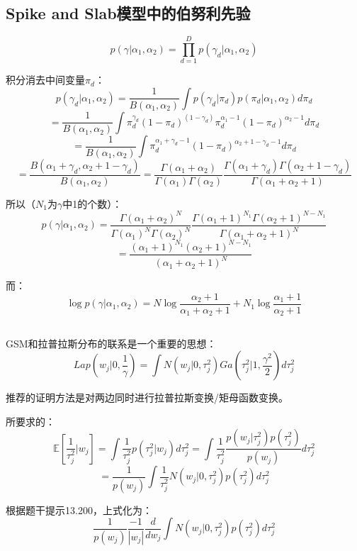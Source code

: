 \documentclass[UTF8]{ctexart}
\begin{document}
\subsection{Spike and Slab模型中的伯努利先验}
$$p(\gamma|\alpha_{1},\alpha_{2})=\prod_{d=1}^{D}p(\gamma_{d}|\alpha_{1},\alpha_{2})$$

积分消去中间变量$\pi_{d}$：
$$p(\gamma_{d}|\alpha_{1},\alpha_{2})=\frac{1}{B(\alpha_{1},\alpha_{2})}\int p(\gamma_{d}|\pi_{d})p(\pi_{d}|\alpha_{1},\alpha_{2})d\pi_{d}$$
$$=\frac{1}{B(\alpha_{1},\alpha_{2})}\int \pi_{d}^{\gamma_{d}}(1-\pi_{d})^{(1-\gamma_{d})}\pi_{d}^{\alpha_{1}-1}(1-\pi_{d})^{\alpha_{2}-1}d\pi_{d}$$
$$=\frac{1}{B(\alpha_{1},\alpha_{2})}\int \pi_{d}^{\alpha_{1}+\gamma_{d}-1}(1-\pi_{d})^{\alpha_{2}+1-\gamma_{d} - 1}d\pi_{d}$$
$$=\frac{B(\alpha_{1}+\gamma_{d},\alpha_{2}+1-\gamma_{d})}{B(\alpha_{1},\alpha_{2})}=\frac{\Gamma(\alpha_{1}+\alpha_{2})}{\Gamma(\alpha_{1})\Gamma(\alpha_{2})} \frac{\Gamma(\alpha_{1}+\gamma_{d})\Gamma(\alpha_{2}+1-\gamma_{d})}{\Gamma(\alpha_{1}+\alpha_{2}+1)}$$

所以（$N_{1}$为$\gamma$中1的个数）：
$$p(\gamma|\alpha_{1},\alpha_{2})=\frac{\Gamma(\alpha_{1}+\alpha_{2})^{N}}{\Gamma(\alpha_{1})^{N}\Gamma(\alpha_{2})^{N}}\frac{\Gamma(\alpha_{1}+1)^{N_{1}}\Gamma(\alpha_{2}+1)^{N-N_{1}}}{\Gamma(\alpha_{1}+\alpha_{2}+1)^{N}}$$
$$=\frac{(\alpha_{1}+1)^{N_{1}}(\alpha_{2}+1)^{N-N_{1}}}{(\alpha_{1}+\alpha_{2}+1)^{N}}$$

而：
$$\log p(\gamma|\alpha_{1},\alpha_{2})=N\log\frac{\alpha_{2}+1}{\alpha_{1}+\alpha_{2}+1} + N_{1} \log \frac{\alpha_{1}+1}{\alpha_{2}+1}$$

\subsection{}
GSM和拉普拉斯分布的联系是一个重要的思想：
$$Lap(w_{j}|0,\frac{1}{\gamma})=\int N(w_{j}|0,\tau_{j}^{2})Ga(\tau_{j}^{2}|1,\frac{\gamma^{2}}{2})d\tau_{j}^{2}$$

推荐的证明方法是对两边同时进行拉普拉斯变换/矩母函数变换。

所要求的：
$$\mathbb{E}[\frac{1}{\tau_{j}^{2}}|w_{j}]=\int \frac{1}{\tau_{j}^{2}}p(\tau_{j}^{2}|w_{j})d\tau_{j}^{2}=\int \frac{1}{\tau_{j}^{2}}\frac{p(w_{j}|\tau_{j}^{2})p(\tau_{j}^{2})}{p(w_{j})}d\tau_{j}^{2}$$
$$=\frac{1}{p(w_{j})}\int \frac{1}{\tau_{j}^{2}}N(w_{j}|0,\tau_{j}^{2})p(\tau_{j}^{2})d\tau_{j}^{2}$$

根据题干提示13.200，上式化为：
$$\frac{1}{p(w_{j})}\frac{-1}{|w_{j}|}\frac{d}{dw_{j}}\int N(w_{j}|0,\tau_{j}^{2})p(\tau_{j}^{2})d\tau_{j}^{2}$$
\end{document}

